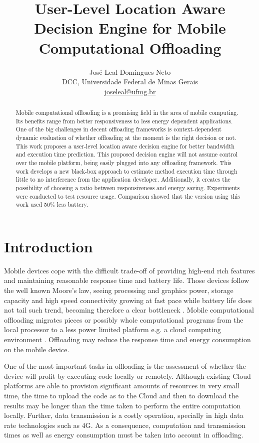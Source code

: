 \documentclass[10pt, conference, letterpaper]{IEEEtran}
\title{User-Level Location Aware Decision Engine for Mobile Computational Offloading}
\author{José Leal Domingues Neto \\ DCC, Universidade Federal de Minas Gerais \\ \href{mailto:joseleal@ufmg.br}{joseleal@ufmg.br}}
\begin{document}
\maketitle

\begin{abstract}
  Mobile computational offloading is a promising field in the area of mobile computing. Its benefits range from better responsiveness to less energy dependent applications. One of the big challenges in decent offloading frameworks is context-dependent dynamic evaluation of whether offloading at the moment is the right decision or not. This work proposes a user-level location aware decision engine for better bandwidth and execution time prediction. This proposed decision engine will not assume control over the mobile platform, being easily plugged into any offloading framework. This work develops a new black-box approach to estimate method execution time through little to no interference from the application developer. Additionally, it creates the possibility of choosing a ratio between responsiveness and energy saving. Experiments were conducted to test resource usage. Comparison showed that the version using this work used 50\% less battery.
\end{abstract}

\section{Introduction}

  Mobile devices cope with the difficult trade-off of providing high-end rich features and maintaining reasonable response time and battery life. Those devices follow the well known Moore's law, seeing processing and graphics power, storage capacity and high speed connectivity growing at fast pace while battery life does not tail such trend, becoming therefore a clear bottleneck \cite{Cuervo:2010:MMS:1814433.1814441}. Mobile computational offloading migrates pieces or possibly whole computational programs from the local processor to a less power limited platform e.g. a cloud computing environment \cite{Scavenger:5466972}. Offloading may reduce the response time and energy consumption on the mobile device.
 
 
  One of the most important tasks in offloading is the assessment of whether the device will profit by executing code locally or remotely. Although existing Cloud platforms are able to provision significant amounts of resources in very small time, the time to upload the code as to the Cloud and then to download the results may be longer than the time taken to perform the entire computation locally. Further, data transmission is a costly operation, specially in high data rate technologies such as 4G. As a consequence, computation and transmission times as well as energy consumption must be taken into account in offloading.
  
\end{document}
